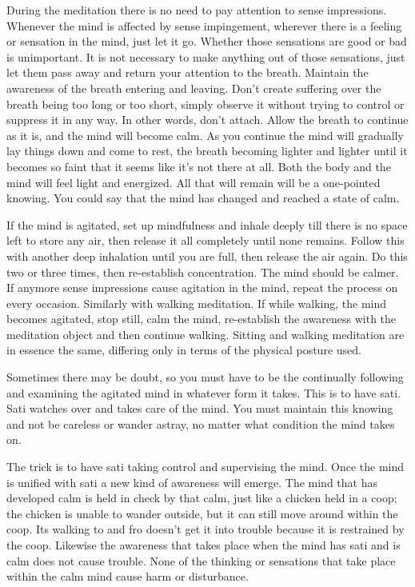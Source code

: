 During the meditation there is no need to pay attention to sense impressions. Whenever the mind is affected by sense impingement, wherever there is a feeling or sensation in the mind, just let it go. Whether those sensations are good or bad is unimportant. It is not necessary to make anything out of those sensations, just let them pass away and return your attention to the breath. Maintain the awareness of the breath entering and leaving. Don't create suffering over the breath being too long or too short, simply observe it without trying to control or suppress it in any way. In other words, don't attach. Allow the breath to continue as it is, and the mind will become calm. As you continue the mind will gradually lay things down and come to rest, the breath becoming lighter and lighter until it becomes so faint that it seems like it's not there at all. Both the body and the mind will feel light and energized. All that will remain will be a one-pointed knowing. You could say that the mind has changed and reached a state of calm.

If the mind is agitated, set up mindfulness and inhale deeply till there is no space left to store any air, then release it all completely until none remains. Follow this with another deep inhalation until you are full, then release the air again. Do this two or three times, then re-establish concentration. The mind should be calmer. If anymore sense impressions cause agitation in the mind, repeat the process on every occasion. Similarly with walking meditation. If while walking, the mind becomes agitated, stop still, calm the mind, re-establish the awareness with the meditation object and then continue walking. Sitting and walking meditation are in essence the same, differing only in terms of the physical posture used.

Sometimes there may be doubt, so you must have  to be the  continually following and examining the agitated mind in whatever form it takes. This is to have sati. Sati watches over and takes care of the mind. You must maintain this knowing and not be careless or wander astray, no matter what condition the mind takes on.

The trick is to have sati taking control and supervising the mind. Once the mind is unified with sati a new kind of awareness will emerge. The mind that has developed calm is held in check by that calm, just like a chicken held in a coop; the chicken is unable to wander outside, but it can still move around within the coop. Its walking to and fro doesn't get it into trouble because it is restrained by the coop. Likewise the awareness that takes place when the mind has sati and is calm does not cause trouble. None of the thinking or sensations that take place within the calm mind cause harm or disturbance.

